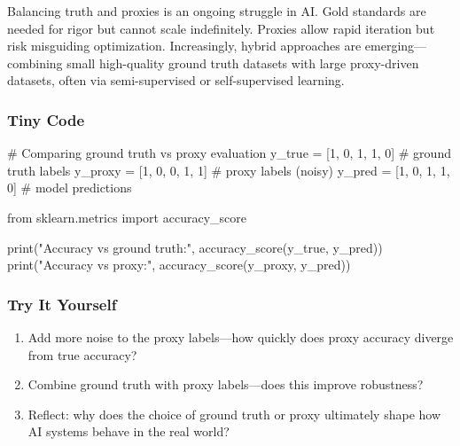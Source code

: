 \documentclass[
  letterpaper,
  DIV=11,
  numbers=noendperiod]{scrreprt}
\newenvironment{Shaded}{\begin{snugshade}}{\end{snugshade}}
\newcommand{\BuiltInTok}[1]{\textcolor[rgb]{0.00,0.23,0.31}{#1}}
\newcommand{\CommentTok}[1]{\textcolor[rgb]{0.37,0.37,0.37}{#1}}
\newcommand{\DecValTok}[1]{\textcolor[rgb]{0.68,0.00,0.00}{#1}}
\newcommand{\ImportTok}[1]{\textcolor[rgb]{0.00,0.46,0.62}{#1}}
\newcommand{\NormalTok}[1]{\textcolor[rgb]{0.00,0.23,0.31}{#1}}
\newcommand{\OperatorTok}[1]{\textcolor[rgb]{0.37,0.37,0.37}{#1}}
\newcommand{\StringTok}[1]{\textcolor[rgb]{0.13,0.47,0.30}{#1}}
\providecommand{\tightlist}{%
  \setlength{\itemsep}{0pt}\setlength{\parskip}{0pt}}
\begin{document}
Balancing truth and proxies is an ongoing struggle in AI. Gold standards
are needed for rigor but cannot scale indefinitely. Proxies allow rapid
iteration but risk misguiding optimization. Increasingly, hybrid
approaches are emerging---combining small high-quality ground truth
datasets with large proxy-driven datasets, often via semi-supervised or
self-supervised learning.

\subsubsection{Tiny Code}\label{tiny-code-81}

\begin{Shaded}
\begin{Highlighting}[]
\CommentTok{\# Comparing ground truth vs proxy evaluation}
\NormalTok{y\_true   }\OperatorTok{=}\NormalTok{ [}\DecValTok{1}\NormalTok{, }\DecValTok{0}\NormalTok{, }\DecValTok{1}\NormalTok{, }\DecValTok{1}\NormalTok{, }\DecValTok{0}\NormalTok{]  }\CommentTok{\# ground truth labels}
\NormalTok{y\_proxy  }\OperatorTok{=}\NormalTok{ [}\DecValTok{1}\NormalTok{, }\DecValTok{0}\NormalTok{, }\DecValTok{0}\NormalTok{, }\DecValTok{1}\NormalTok{, }\DecValTok{1}\NormalTok{]  }\CommentTok{\# proxy labels (noisy)}
\NormalTok{y\_pred   }\OperatorTok{=}\NormalTok{ [}\DecValTok{1}\NormalTok{, }\DecValTok{0}\NormalTok{, }\DecValTok{1}\NormalTok{, }\DecValTok{1}\NormalTok{, }\DecValTok{0}\NormalTok{]  }\CommentTok{\# model predictions}

\ImportTok{from}\NormalTok{ sklearn.metrics }\ImportTok{import}\NormalTok{ accuracy\_score}

\BuiltInTok{print}\NormalTok{(}\StringTok{"Accuracy vs ground truth:"}\NormalTok{, accuracy\_score(y\_true, y\_pred))}
\BuiltInTok{print}\NormalTok{(}\StringTok{"Accuracy vs proxy:"}\NormalTok{, accuracy\_score(y\_proxy, y\_pred))}
\end{Highlighting}
\end{Shaded}

\subsubsection{Try It Yourself}\label{try-it-yourself-81}

\begin{enumerate}
\def\labelenumi{\arabic{enumi}.}
\tightlist
\item
  Add more noise to the proxy labels---how quickly does proxy accuracy
  diverge from true accuracy?
\item
  Combine ground truth with proxy labels---does this improve robustness?
\item
  Reflect: why does the choice of ground truth or proxy ultimately shape
  how AI systems behave in the real world?
\end{enumerate}
\end{document}
